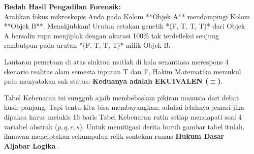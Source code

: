 \textbf{Bedah Hasil Pengadilan Forensik:} \\
Arahkan fokus mikroskopis Anda pada Kolom **Objek A** mendampingi Kolom **Objek B**. Menakjubkan! Urutan cetakan genetik *(F, T, T, T)* dari Objek A bersalin rupa menjiplak dengan akurasi 100\% tak terdefleksi seujung rambutpun pada urutan *(F, T, T, T)* milik Objek B.

Lantaran pemetaan di atas sinkron mutlak di kala senantiasa merespons 4 skenario realitas alam semesta inputan T dan F, Hakim Matematika memukul palu menyatakan sah status: \textbf{Keduanya adalah EKUIVALEN ($\equiv$)}. 

Tabel Kebenaran ini sungguh ajaib membebaskan pikiran manusia dari debat kusir panjang. Tapi tentu kita bisa membayangkan; aduhai lelahnya jemari jika dipaksa harus melukis 16 baris Tabel Kebenaran rutin setiap mendapati soal 4 variabel abstrak ($p, q, r, s$). Untuk memitigasi derita buruh gambar tabel itulah, ilmuwan menciptakan sekumpulan relik sontekan rumus \textbf{Hukum Dasar Aljabar Logika} \cite{wiki_proplogic}.
